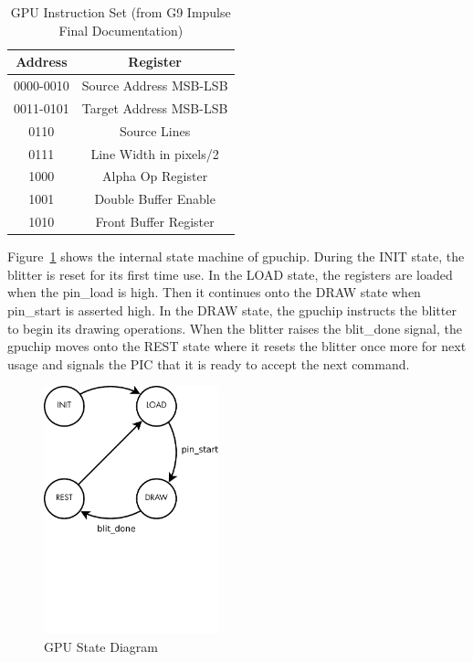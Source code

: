 \documentclass{report}
\begin{document}
\begin{table}[htb!]
    \begin{center}
        \begin{tabular}{ | c | c | }
            \hline
            Address & Register \\
            \hline
            0000-0010 & Source Address MSB-LSB \\
            \hline
            0011-0101 & Target Address MSB-LSB \\
            \hline
            0110 & Source Lines \\
            \hline
            0111 & Line Width in pixels/2 \\
            \hline
            1000 & Alpha Op Register \\
            \hline
            1001 & Double Buffer Enable \\
            \hline
            1010 & Front Buffer Register \\
            \hline
        \end{tabular}
    \end{center}
    \caption{GPU Instruction Set (from G9 Impulse Final Documentation)}
    \label{tab:gpu_instructions}
\end{table}

Figure~\ref{fig:gpu_state_diagram} shows the internal state machine of 
gpuchip. During the INIT state, the blitter is reset for its first time 
use. In the LOAD state, the registers are loaded when the pin\_load is 
high. Then it continues onto the DRAW state when pin\_start is asserted 
high. In the DRAW state, the gpuchip instructs the blitter to begin its 
drawing operations. When the blitter raises the blit\_done signal, the 
gpuchip moves onto the REST state where it resets the blitter once more 
for next usage and signals the PIC that it is ready to accept the next 
command.

\begin{figure}[htb!]
    \begin{center}
        \includegraphics[width=2in,trim=0 2.3in 0 0,clip=true]{gpu_state}
    \end{center}
    \caption{GPU State Diagram}
    \label{fig:gpu_state_diagram}
\end{figure}
\end{document}
